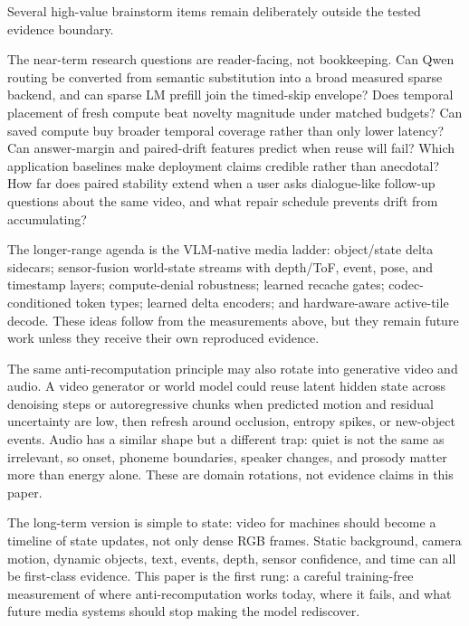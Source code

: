 Several high-value brainstorm items remain deliberately outside the tested
evidence boundary.

The near-term research questions are reader-facing, not bookkeeping. Can Qwen
routing be converted from semantic substitution into a broad measured sparse
backend, and can sparse LM prefill join the timed-skip envelope? Does temporal
placement of fresh compute beat novelty magnitude under matched budgets? Can
saved compute buy broader temporal coverage rather than only lower latency? Can
answer-margin and paired-drift features predict when reuse will fail? Which
application baselines make deployment claims credible rather than anecdotal?
How far does paired stability extend when a user asks dialogue-like follow-up
questions about the same video, and what repair schedule prevents drift from
accumulating?

The longer-range agenda is the VLM-native media ladder: object/state delta
sidecars; sensor-fusion world-state streams with depth/ToF, event, pose, and
timestamp layers; compute-denial robustness; learned recache gates;
codec-conditioned token types; learned delta encoders; and hardware-aware
active-tile decode. These ideas follow from the measurements above, but they
remain future work unless they receive their own reproduced evidence.

The same anti-recomputation principle may also rotate into generative video
and audio. A video generator or world model could reuse latent hidden state
across denoising steps or autoregressive chunks when predicted motion and
residual uncertainty are low, then refresh around occlusion, entropy spikes, or
new-object events. Audio has a similar shape but a different trap: quiet is not
the same as irrelevant, so onset, phoneme boundaries, speaker changes, and
prosody matter more than energy alone. These are domain rotations, not evidence
claims in this paper.

The long-term version is simple to state: video for machines should become a
timeline of state updates, not only dense RGB frames. Static background,
camera motion, dynamic objects, text, events, depth, sensor confidence, and
time can all be first-class evidence. This paper is the first rung: a careful
training-free measurement of where anti-recomputation works today, where it
fails, and what future media systems should stop making the model rediscover.
